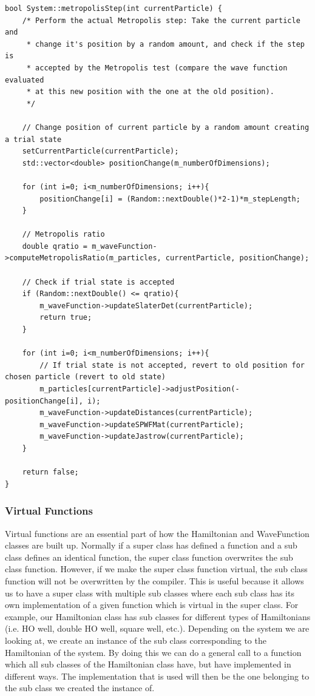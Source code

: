 \documentclass[../main.tex]{subfiles}
\begin{document}
\lstset{language=c++}
\begin{lstlisting}[caption={Metropolis Step Without Importance Sampling}]
bool System::metropolisStep(int currentParticle) {
    /* Perform the actual Metropolis step: Take the current particle and
     * change it's position by a random amount, and check if the step is
     * accepted by the Metropolis test (compare the wave function evaluated
     * at this new position with the one at the old position).
     */

    // Change position of current particle by a random amount creating a trial state
    setCurrentParticle(currentParticle);
    std::vector<double> positionChange(m_numberOfDimensions);

    for (int i=0; i<m_numberOfDimensions; i++){
        positionChange[i] = (Random::nextDouble()*2-1)*m_stepLength;
    }

    // Metropolis ratio
    double qratio = m_waveFunction->computeMetropolisRatio(m_particles, currentParticle, positionChange);

    // Check if trial state is accepted
    if (Random::nextDouble() <= qratio){
        m_waveFunction->updateSlaterDet(currentParticle);
        return true;
    }

    for (int i=0; i<m_numberOfDimensions; i++){
        // If trial state is not accepted, revert to old position for chosen particle (revert to old state)
        m_particles[currentParticle]->adjustPosition(-positionChange[i], i);
        m_waveFunction->updateDistances(currentParticle);
        m_waveFunction->updateSPWFMat(currentParticle);
        m_waveFunction->updateJastrow(currentParticle);
    }

    return false;
}
\end{lstlisting}


\subsubsection{Virtual Functions}

Virtual functions are an essential part of how the Hamiltonian and WaveFunction classes are built up. Normally if a super class has defined a function and a sub class defines an identical function, the super class function overwrites the sub class function. However, if we make the super class function virtual, the sub class function will not be overwritten by the compiler. This is useful because it allows us to have a super class with multiple sub classes where each sub class has its own implementation of a given function which is virtual in the super class. For example, our Hamiltonian class has sub classes for different types of Hamiltonians (i.e. HO well, double HO well, square well, etc.). Depending on the system we are looking at, we create an instance of the sub class corresponding to the Hamiltonian of the system. By doing this we can do a general call to a function which all sub classes of the Hamiltonian class have, but have implemented in different ways. The implementation that is used will then be the one belonging to the sub class we created the instance of. 
\end{document}
